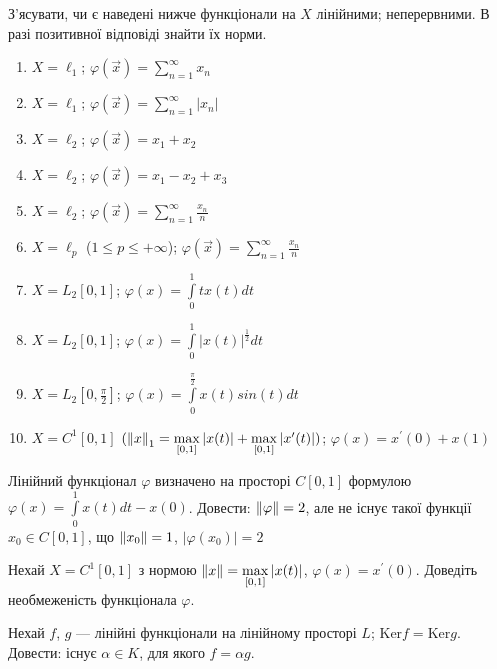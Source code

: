 \begin{exercise}
    З'ясувати, чи є наведені нижче функціонали на $X$ лінійними; 
    неперервними. В разі позитивної відповіді знайти їх норми.
    \begin{enumerate}[label=\ukr*)]
        \item $X = \ell_1$; $\varphi(\vec{x}) = \sum\limits_{n=1}^{\infty} x_n $
        \item $X = \ell_1$; $\varphi(\vec{x}) = \sum\limits_{n=1}^{\infty} |x_n| $
        \item $X = \ell_2$; $\varphi(\vec{x}) = x_1 + x_2 $
        \item $X = \ell_2$; $\varphi(\vec{x}) = x_1 - x_2 + x_3$
        \item $X = \ell_2$; $\varphi(\vec{x}) = \sum\limits_{n=1}^{\infty} \frac{x_n}{n}$
        \item $X = \ell_p$ ($1 \leq p \leq +\infty$); $\varphi(\vec{x}) = 
        \sum\limits_{n=1}^{\infty} \frac{x_n}{n}$
        \item $X = L_2[0,1]$; $\varphi(x) = \int\limits_0^1 tx(t)dt$
        \item $X = L_2[0,1]$; $\varphi(x) = \int\limits_0^1 |x(t)|^{\frac{1}{2}}dt$
        \item $X = L_2[0,\frac{\pi}{2}]$; 
        $\varphi(x) = \int\limits_0^{\frac{\pi}{2}} x(t)sin(t)dt$
        \item $X = C^1[0,1]$ $(\left\lVert x\right\rVert_1 = \max\limits_{[0,1]}|x(t)| + 
        \max\limits_{[0,1]}|x^{\prime}(t)|)$; $\varphi(x) = x^{\prime}(0) + x(1)$
    \end{enumerate}
\end{exercise}

\begin{exercise}
    Лінійний функціонал $\varphi$ визначено на просторі $C[0, 1]$ формулою 
    $\varphi(x) = \int\limits_0^1 x(t)dt - x(0)$. Довести: $\left\lVert\varphi\right\rVert = 2$, 
    але не існує такої функції $x_0 \in C[0, 1]$, що $\left\lVert x_0\right\rVert = 1$, $|\varphi(x_0)| = 2$
\end{exercise}

\begin{exercise}
    Нехай $X = C^1[0, 1]$ з нормою $\left\lVert x\right\rVert = \max\limits_{[0, 1]}|x(t)|$, 
    $\varphi(x) = x^\prime(0)$. Доведіть необмеженість функціонала $\varphi$.
\end{exercise}

\begin{exercise}
    Нехай $f$, $g$ --- лінійні функціонали на лінійному просторі $L$; $\mathrm{Ker} f = \mathrm{Ker} g$. 
    Довести: існує $\alpha \in K$, для якого $f = \alpha g$.
\end{exercise}

